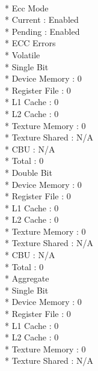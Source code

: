 \documentclass{article}
\begin{document}
   \\*  Ecc Mode
    \\*     Current                           : Enabled
    \\*     Pending                           : Enabled
   \\*  ECC Errors
      \\*   Volatile
    \\*         Single Bit            
      \\*           Device Memory             : 0
      \\*           Register File             : 0
       \\*          L1 Cache                  : 0
        \\*         L2 Cache                  : 0
        \\*         Texture Memory            : 0
          \\*       Texture Shared            : N/A
          \\*        CBU                       : N/A
        \\*         Total                     : 0
         \\*    Double Bit            
        \\*         Device Memory             : 0
          \\*       Register File             : 0
         \\*        L1 Cache                  : 0
          \\*       L2 Cache                  : 0
           \\*      Texture Memory            : 0
           \\*      Texture Shared            : N/A
            \\*     CBU                       : N/A
          \\*       Total                     : 0
       \\*  Aggregate
         \\*    Single Bit            
         \\*        Device Memory             : 0
          \\*       Register File             : 0
          \\*       L1 Cache                  : 0
           \\*      L2 Cache                  : 0
           \\*      Texture Memory            : 0
           \\*      Texture Shared            : N/A
\end{document}
